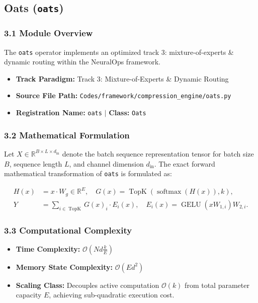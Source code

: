\subsection{Oats (\texttt{oats})}
\label{sec:app_module_oats}

\subsubsection*{3.1 Module Overview}
The \texttt{oats} operator implements an optimized track 3: mixture-of-experts \& dynamic routing within the NeuralOps framework.
\begin{itemize}
    \item \textbf{Track Paradigm:} Track 3: Mixture-of-Experts & Dynamic Routing
    \item \textbf{Source File Path:} \texttt{Codes/framework/compression\_engine/oats.py}
    \item \textbf{Registration Name:} \texttt{oats} $\mid$ \textbf{Class:} \texttt{Oats}
\end{itemize}

\subsubsection*{3.2 Mathematical Formulation}
Let $X \in \mathbb{R}^{B \times L \times d_{\text{in}}}$ denote the batch sequence representation tensor for batch size $B$, sequence length $L$, and channel dimension $d_{\text{in}}$. The exact forward mathematical transformation of \texttt{oats} is formulated as:

\begin{align}
H(x) &= x \cdot W_g \in \mathbb{R}^{E}, \quad G(x) = \operatorname{TopK}\left(\operatorname{softmax}(H(x)), k\right), \\
Y &= \sum_{i \in \operatorname{TopK}} G(x)_i \cdot E_i(x), \quad E_i(x) = \operatorname{GELU}(x W_{1, i}) W_{2, i}.
\end{align}


\subsubsection*{3.3 Computational Complexity}
\begin{itemize}
    \item \textbf{Time Complexity:} $\mathcal{O}(N d \frac{k}{E})$
    \item \textbf{Memory State Complexity:} $\mathcal{O}(E d^2)$
    \item \textbf{Scaling Class:} Decouples active computation $\mathcal{O}(k)$ from total parameter capacity $E$, achieving sub-quadratic execution cost.
\end{itemize}

